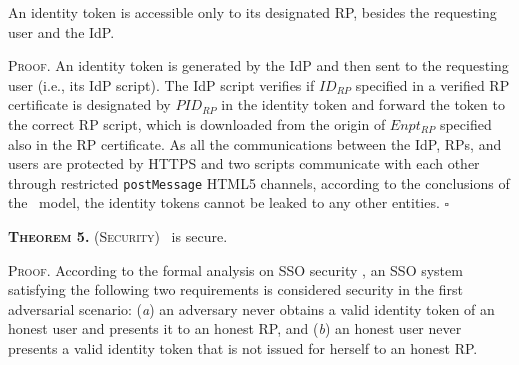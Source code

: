 

\vspace{2mm}
 { An identity token is accessible only to its designated RP, besides the requesting user and the IdP.}

\vspace{0.75mm}
\noindent\textsc{Proof.}
An identity token is generated by the IdP and then sent to the requesting user (i.e., its IdP script).
The IdP script verifies if $ID_{RP}$ specified in a verified RP certificate is designated by $PID_{RP}$ in the identity token and forward the token to the correct RP script, which is downloaded from the origin of $Enpt_{RP}$ specified also in the RP certificate. %
As all the communications between the IdP, RPs, and users are protected by HTTPS and two scripts communicate with each other through restricted \verb+postMessage+ HTML5 channels, according to the conclusions of the \dyu\ model, the identity tokens cannot be leaked to any other entities. \hfill $\square$


\vspace{2mm}
\noindent\textsc{\textbf{Theorem 5.} (Security)} {\usso\ is secure.}

\vspace{0.75mm}
\noindent\textsc{Proof.}
According to the formal analysis on SSO security \cite{SPRESSO, FettKS14},
    an SSO system satisfying the following two requirements is considered security in the first adversarial scenario: (\emph{a}) an adversary never obtains a valid identity token of an honest user and presents it to an honest RP, and (\emph{b}) an honest user never presents a valid identity token that is not issued for herself to an honest RP.


